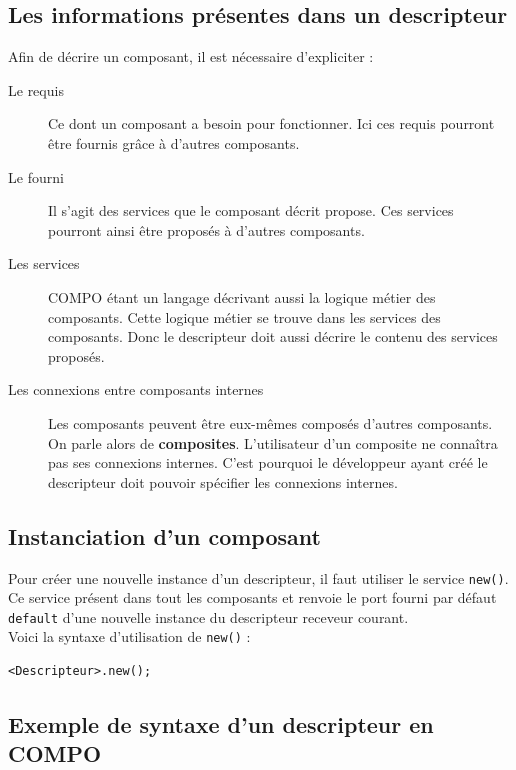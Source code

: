 \documentclass[11pt,a4paper,openany,oneside]{book}
\begin{document}
\subsection{Les informations présentes dans un descripteur}

Afin de décrire un composant, il est nécessaire d'expliciter :
\begin{description}
\item[Le requis]Ce dont un composant a besoin pour fonctionner. Ici ces requis pourront être fournis grâce à d'autres composants.
\item[Le fourni]Il s'agit des services que le composant décrit propose. Ces services pourront ainsi être proposés à d'autres composants.
\item[Les services]COMPO étant un langage décrivant aussi la logique métier des composants. Cette logique métier se trouve dans les services des composants. Donc le descripteur doit aussi décrire le contenu des services proposés.
\item[Les connexions entre composants internes]Les composants peuvent être eux-mêmes composés d'autres composants. On parle alors de \textbf{composites}. L'utilisateur d'un composite ne connaîtra pas ses connexions internes. C'est pourquoi le développeur ayant créé le descripteur doit pouvoir spécifier les connexions internes.
\end{description}


\subsection{Instanciation d'un composant}

Pour créer une nouvelle instance d'un descripteur, il faut utiliser le service \texttt{new()}.\\
Ce service présent dans tout les composants et renvoie le port fourni par défaut \texttt{default} d'une nouvelle instance du descripteur receveur courant.\\
Voici la syntaxe d'utilisation de \texttt{new()} : 
\begin{lstlisting}[language=Compo, frame=single, caption=Syntaxe de création d'un nouveau composant]
<Descripteur>.new();
\end{lstlisting}

\subsection{Exemple de syntaxe d'un descripteur en COMPO}
\end{document}
